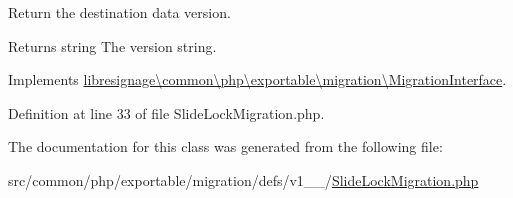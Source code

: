 Return the destination data version.

\begin{DoxyReturn}{Returns}
string The version string. 
\end{DoxyReturn}


Implements \hyperlink{interfacelibresignage_1_1common_1_1php_1_1exportable_1_1migration_1_1MigrationInterface_a9eddabf63771d4d1081bd6d067c7dff5}{libresignage\textbackslash{}common\textbackslash{}php\textbackslash{}exportable\textbackslash{}migration\textbackslash{}\+Migration\+Interface}.



Definition at line 33 of file Slide\+Lock\+Migration.\+php.



The documentation for this class was generated from the following file\+:\begin{DoxyCompactItemize}
\item 
src/common/php/exportable/migration/defs/v1\+\_\+\_/\hyperlink{v1__0__0_2SlideLockMigration_8php}{Slide\+Lock\+Migration.\+php}\end{DoxyCompactItemize}

